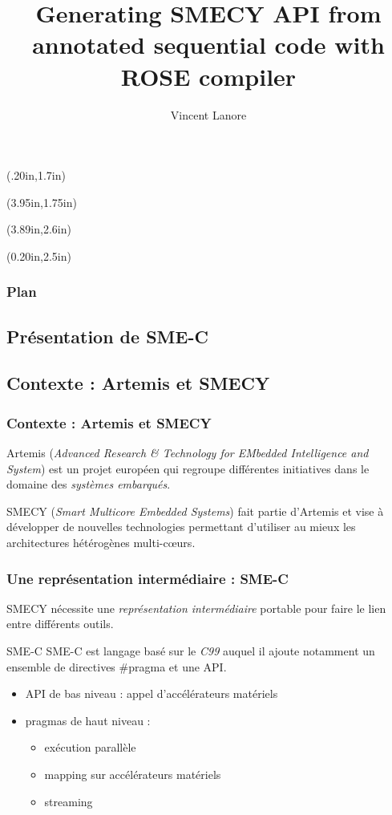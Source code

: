 \documentclass{beamer}
\title{Generating SMECY API from annotated sequential code with ROSE compiler}
\author{Vincent \sc Lanore}
\institute{HPC Project Montpellier \\ Encadré par Ronan \textsc{Keryell} \\et Thierry \textsc{Porcher}}
\begin{document}
\begin{frame} 
  \titlepage 
\begin{textblock*}{\textwidth}(.20in,1.7in) 
\end{textblock*}
\begin{textblock*}{\textwidth}(3.95in,1.75in) 
\end{textblock*}
\begin{textblock*}{\textwidth}(3.89in,2.6in) 
\end{textblock*} 
\begin{textblock*}{\textwidth}(0.20in,2.5in) 
\end{textblock*} 
\end{frame} 


\begin{frame}
\frametitle{Plan}
\tableofcontents
\end{frame}

\begin{frame}
\section{Présentation de SME-C}
\subsection{Contexte : Artemis et SMECY}
\frametitle{Contexte : Artemis et SMECY}
\alert{Artemis} (\emph{Advanced Research \& Technology for EMbedded Intelligence and System}) est un projet européen qui regroupe différentes initiatives dans le domaine des \emph{systèmes embarqués}.

\vspace{0.66cm}
\alert{SMECY} (\emph{Smart Multicore Embedded Systems}) fait partie d'Artemis et vise à développer de nouvelles technologies permettant d'utiliser au mieux les \alert{architectures hétérogènes multi-cœurs}. 
\end{frame}

\begin{frame}
\frametitle{Une représentation intermédiaire : SME-C}
SMECY nécessite une \emph{représentation intermédiaire} portable pour faire le lien entre différents outils.
\begin{block}{SME-C}
\alert{SME-C} est langage basé sur le \emph{C99} auquel il ajoute notamment un ensemble de \alert{directives \#pragma} et une API.
\end{block}

\begin{itemize}
	\item API de bas niveau : appel d'accélérateurs matériels
	\item pragmas de haut niveau :
	\begin{itemize}
		\item exécution parallèle
		\item mapping sur accélérateurs matériels
		\item streaming
	\end{itemize}
\end{itemize}
\end{frame}
\end{document}
